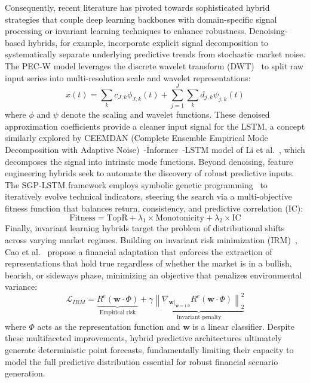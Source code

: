 \documentclass[11pt,a4paper]{article}
\begin{document}
Consequently, recent literature has pivoted towards sophisticated hybrid strategies that couple deep learning backbones with domain-specific signal processing or invariant learning techniques to enhance robustness. Denoising-based hybrids, for example, incorporate explicit signal decomposition to systematically separate underlying predictive trends from stochastic market noise. The PEC-W model \citep{caliskan2025} leverages the discrete wavelet transform (DWT)~\citep{mallat1989theory} to split raw input series into multi-resolution scale and wavelet representations:
\begin{equation}
x(t) = \sum_k c_{J,k} \phi_{J,k}(t) + \sum_{j=1}^J \sum_k d_{j,k} \psi_{j,k}(t)
\end{equation}
where $\phi$ and $\psi$ denote the scaling and wavelet functions. These denoised approximation coefficients provide a cleaner input signal for the LSTM, a concept similarly explored by CEEMDAN (Complete Ensemble Empirical Mode Decomposition with Adaptive Noise)~\citep{torres2011complete}-Informer~\citep{zhou2021informer}-LSTM model of Li et al.~\citep{li2025ceemdan}, which decomposes the signal into intrinsic mode functions. Beyond denoising, feature engineering hybrids seek to automate the discovery of robust predictive inputs. The SGP-LSTM framework \citep{SGP-LSTM1} employs symbolic genetic programming~\citep{koza1992genetic} to iteratively evolve technical indicators, steering the search via a multi-objective fitness function that balances return, consistency, and predictive correlation (IC):
\begin{equation}
\text{Fitness} = \text{TopR} + \lambda_1 \times \text{Monotonicity} + \lambda_2 \times \text{IC}
\end{equation}
Finally, invariant learning hybrids target the problem of distributional shifts across varying market regimes. Building on invariant risk minimization (IRM)~\citep{arjovsky2019invariant}, Cao et al.~\citep{cao2023irm} propose a financial adaptation that enforces the extraction of representations that hold true regardless of whether the market is in a bullish, bearish, or sideways phase, minimizing an objective that penalizes environmental variance:
\begin{equation}
\mathcal{L}_{IRM} = \underbrace{R^e(\mathbf{w} \cdot \Phi)}_{\text{Empirical risk}} + \gamma \underbrace{\left\| \nabla_{\mathbf{w}|_{\mathbf{w}=1.0}} R^e(\mathbf{w} \cdot \Phi) \right\|_2^2}_{\text{Invariant penalty}}
\end{equation}
where $\Phi$ acts as the representation function and $\mathbf{w}$ is a linear classifier. Despite these multifaceted improvements, hybrid predictive architectures ultimately generate deterministic point forecasts, fundamentally limiting their capacity to model the full predictive distribution essential for robust financial scenario generation.
\end{document}
